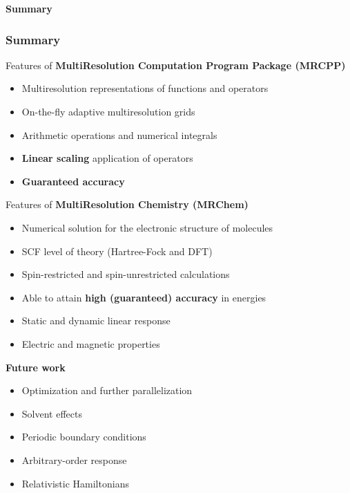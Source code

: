 \begin{frame}
    \centering
    \textbf{\Large{Summary}}
\end{frame}

\begin{frame}
    \frametitle{Summary}
    \tiny
    Features of \textbf{MultiResolution Computation Program Package (MRCPP)}
    \begin{itemize}
        \item   Multiresolution representations of functions and operators
        \item   On-the-fly adaptive multiresolution grids
        \item   Arithmetic operations and numerical integrals
        \item   \textbf{Linear scaling} application of operators
        \item   \textbf{Guaranteed accuracy}
    \end{itemize}
    \vspace{5mm}
    \pause
    Features of \textbf{MultiResolution Chemistry (MRChem)}
    \begin{itemize}
        \item   Numerical solution for the electronic structure of molecules
        \item   SCF level of theory (Hartree-Fock and DFT)
        \item   Spin-restricted and spin-unrestricted calculations
        \item   Able to attain \textbf{high (guaranteed) accuracy} in energies
        \item   Static and dynamic linear response
	\item	Electric and magnetic properties
    \end{itemize}
    \vspace{5mm}
    \pause
    \textbf{Future work}
    \begin{itemize}
        \item   Optimization and further parallelization
        \item   Solvent effects
        \item   Periodic boundary conditions
        \item   Arbitrary-order response
        \item   Relativistic Hamiltonians
    \end{itemize}
\end{frame}

